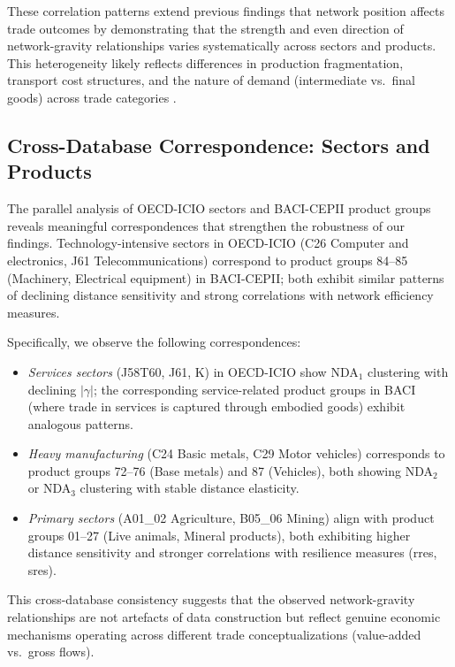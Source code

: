 \documentclass[preprint, 3p,
authoryear]{elsarticle} %
\begin{document}
These correlation patterns extend previous findings that network
position affects trade outcomes \citep{fagiolo2009, debenedictis2011} by
demonstrating that the strength and even direction of network-gravity
relationships varies systematically across sectors and products. This
heterogeneity likely reflects differences in production fragmentation,
transport cost structures, and the nature of demand (intermediate
vs.~final goods) across trade categories
\citep{johnson2012, koopman2014}.

\subsection{Cross-Database Correspondence: Sectors and
Products}\label{subsec:correspondence}

The parallel analysis of OECD-ICIO sectors and BACI-CEPII product groups
reveals meaningful correspondences that strengthen the robustness of our
findings. Technology-intensive sectors in OECD-ICIO (C26 Computer and
electronics, J61 Telecommunications) correspond to product groups 84--85
(Machinery, Electrical equipment) in BACI-CEPII; both exhibit similar
patterns of declining distance sensitivity and strong correlations with
network efficiency measures.

Specifically, we observe the following correspondences:

\begin{itemize}
    \item \textit{Services sectors} (J58T60, J61, K) in OECD-ICIO show NDA$_1$ clustering with declining $|\gamma|$; the corresponding service-related product groups in BACI (where trade in services is captured through embodied goods) exhibit analogous patterns.
    \item \textit{Heavy manufacturing} (C24 Basic metals, C29 Motor vehicles) corresponds to product groups 72--76 (Base metals) and 87 (Vehicles), both showing NDA$_2$ or NDA$_3$ clustering with stable distance elasticity.
    \item \textit{Primary sectors} (A01\_02 Agriculture, B05\_06 Mining) align with product groups 01--27 (Live animals, Mineral products), both exhibiting higher distance sensitivity and stronger correlations with resilience measures (\gls{rres}, \gls{sres}).
\end{itemize}

This cross-database consistency suggests that the observed
network-gravity relationships are not artefacts of data construction but
reflect genuine economic mechanisms operating across different trade
conceptualizations (value-added vs.~gross flows).
\end{document}
